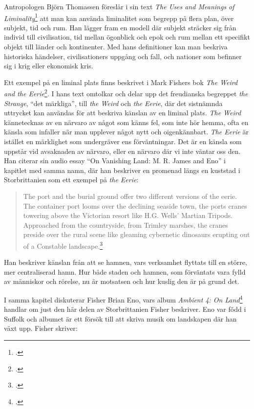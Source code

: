 \documentclass{article}
\begin{document}
Antropologen Björn Thomassen föreslår i sin text \emph{The Uses and Meanings of
Liminality}\footcite[12-13]{Thomassen} att man kan använda liminalitet som begrepp på flera plan, över
subjekt, tid och rum. Han lägger fram en modell där subjekt sträcker sig från individ till civilisation, tid
mellan ögonblick och epok och rum mellan ett specifikt objekt till länder och kontinenter. Med hans
definitioner kan man beskriva historiska händelser, civilisationers uppgång och fall, och nationer som
befinner sig i krig eller ekonomisk kris.

Ett exempel på en liminal plats finns beskrivet i Mark Fishers bok \emph{The Weird and the
Eerie}\footcite{Fisher}. I hans text omtolkar och delar upp det freudianska begreppet \emph{the Strange},
``det märkliga'', till \emph{the Weird} och \emph{the Eerie}, där det sistnämnda uttrycket kan användas för
att beskriva känslan av en liminal plats. \emph{The Weird} kännetecknas av en närvaro av något som känns fel,
som inte hör hemma, ofta en känsla som infaller när man upplever något nytt och oigenkännbart. \emph{The
Eerie} är istället en märklighet som undergräver ens förväntningar. Det är en känsla som uppstår vid
avsaknaden av närvaro, eller en närvaro där vi inte väntar oss den. Han citerar sin audio essay ``On Vanishing
Land: M. R. James and Eno'' i kapitlet med samma namn, där han beskriver en promenad längs en kuststad i
Storbrittanien som ett exempel på \emph{the Eerie}:

\begin{quote}
The port and the burial ground offer two different versions of the eerie. The container port looms over the
declining seaside town, the ports cranes towering above the Victorian resort like H.G. Wells' Martian Tripods.
Approached from the countryside, from Trimley marshes, the cranes preside over the rural scene like gleaming
	cybernetic dinosaurs erupting out of a Constable landscape.\footcite[76]{Fisher}
\end{quote}

Han beskriver känslan från att se hamnen, vars verksamhet flyttats till en större, mer centraliserad hamn. 
Hur både staden och hamnen, som förväntats vara fylld av människor och rörelse, nu är motsatsen och hur kuslig
den är på grund det.

I samma kapitel diskuterar Fisher Brian Eno, vars album \emph{Ambient 4: On Land}\footcite{EnoLand} handlar om
just den här delen av Storbrittanien Fisher beskriver. Eno var född i Suffolk och albumet är ett försök till att skriva
musik om landskapen där han växt upp. Fisher skriver: 
\end{document}
